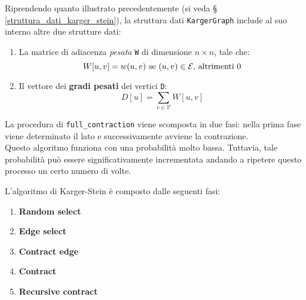 Riprendendo quanto illustrato precedentemente (si veda \S
\ref{struttura_dati_karger_stein}), la struttura dati \verb|KargerGraph| 
include al suo interno altre due strutture dati:
\begin{enumerate}
    \item La matrice di adiacenza \textit{pesata} \verb|W| di dimensione 
    $n \times n$, tale che: 
    \[
        W[u,v] = w(u,v) \textnormal{ se } (u,v) \in \mathcal{E} 
        \textnormal{, altrimenti } 0
    \]
    \item Il vettore dei \textbf{gradi pesati} dei vertici \verb|D|:
    \[
        D[u] = \sum_{v \in \mathcal{V}} W[u,v]
    \]
\end{enumerate}

La procedura di \verb|full_contraction| viene scomposta in due fasi: 
nella prima fase viene determinato il lato e successivamente avviene la 
contrazione.
\\ Questo algoritmo funziona con una probabilità molto bassa. Tuttavia, tale probabilità 
può essere significativamente incrementata andando a ripetere questo processo un certo 
numero di volte.

\noindent L'algoritmo di Karger-Stein è composto dalle seguenti fasi:
\begin{enumerate}
    \item \textbf{Random select}
    \item \textbf{Edge select}
    \item \textbf{Contract edge}
    \item \textbf{Contract}
    \item \textbf{Recursive contract}
\end{enumerate}

